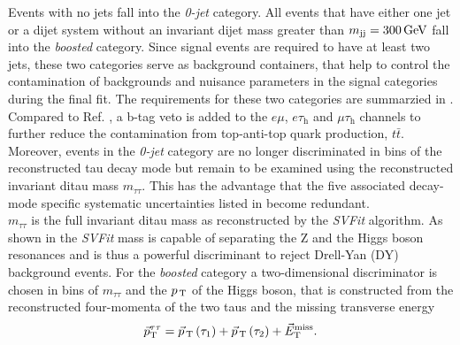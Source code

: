 Events with no jets fall into the \textit{0-jet} category. All events that have either one jet or a dijet system without an invariant dijet mass greater than $m_\text{jj}=\text{300\,{GeV}}$ fall into the \textit{boosted} category. 
Since signal events are required to have at least two jets, these two categories serve as background containers, that help to control the contamination of backgrounds and nuisance parameters
in the signal categories during the final fit. The requirements for these two categories are summarzied in .
Compared to Ref. \cite{Sirunyan:2017khh}, a b-tag veto is added to the $e\mu$, $e\tau_\text{h}$ and $\mu\tau_\text{h}$ channels to further reduce the contamination from top-anti-top quark production, $t\bar{t}$. 
Moreover, events in the \textit{0-jet} category are no longer discriminated in bins of the reconstructed tau decay mode but remain to be examined using the reconstructed invariant ditau mass $m_{\tau\tau}$. This has the advantage that 
the five associated decay-mode specific systematic uncertainties listed in  become redundant. \\
$m_{\tau\tau}$ is the full invariant ditau mass as reconstructed by the \textit{SVFit} algorithm. As shown in  the \textit{SVFit} mass is 
capable of separating the Z and the Higgs boson resonances and is thus a powerful discriminant to reject Drell-Yan (DY) background events. 
For the \textit{boosted} category a two-dimensional discriminator is chosen in bins of $m_{\tau\tau}$ and the $p_\text{\,T}$ of the Higgs boson, that is constructed from the reconstructed four-momenta of the two taus and the missing transverse energy
\begin{equation}
    \vec{p}_{\text{T}}^{\tau\tau}=  \vec{p}_{\text{\,T}} \left( \tau_1 \right) + \vec{p}_{\text{\,T}} \left( \tau_2 \right) + \vec{E}_\text{T}^\text{miss}.
\end{equation}
